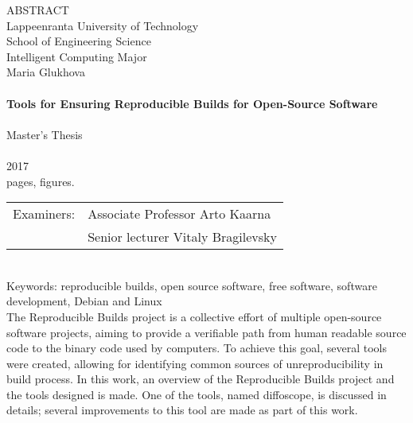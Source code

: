 {\centering
%
\SuperFont\MakeTextUppercase{Abstract}\\
}
\noindent Lappeenranta University of Technology\\
School of Engineering Science\\
Intelligent Computing Major\\


\noindent Maria Glukhova\\
\\
\textbf{Tools for Ensuring Reproducible Builds for Open-Source Software}\\
\\
Master's Thesis\\
\\
2017\\
\pageref{LastPage} pages, \totalfigures{} figures.\\


\begin{tabular}{l p{11.0cm}}  
  
Examiners: & Associate Professor \foreignlanguage{finnish}{Arto Kaarna}\\
& Senior lecturer Vitaly Bragilevsky\\

\end {tabular}\\

Keywords: reproducible builds, open source software, free software, software development, Debian and Linux\\


The Reproducible Builds project is a collective effort of multiple open-source software
projects, aiming to provide a verifiable path from human readable source code
to the binary code used by computers. To achieve this goal, several tools were
created, allowing for identifying common sources of unreproducibility in build
process.
In this work, an overview of the Reproducible Builds project and the tools designed is made. One of the tools, named diffoscope, is discussed in details; several improvements to this tool are made as part of this work.\\
